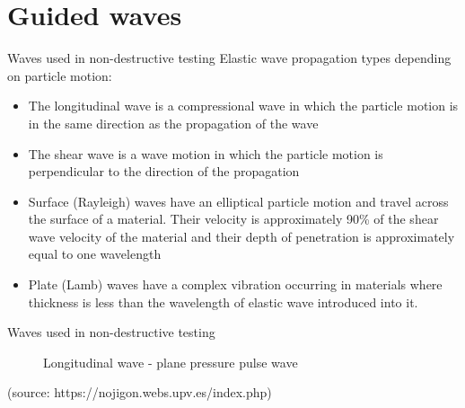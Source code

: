 \documentclass[10pt,aspectratio=169,dvipsnames]{beamer} %
\begin{document}
	\section{Guided waves}
	\begin{frame}{Waves used in non-destructive testing}
		Elastic wave propagation types depending on particle motion:
		\begin{itemize}
				\item  \alert{The longitudinal wave} is a compressional wave in which the particle motion is in the same direction as the propagation of the wave
				\item \alert{The shear wave} is a wave motion in which the particle motion is perpendicular to the direction of the propagation
				\item \alert{Surface (Rayleigh) waves} have an elliptical particle motion and travel across the surface of a material. Their velocity is approximately 90\% of the shear wave velocity of the material and their depth of penetration is approximately equal to one
				wavelength
				\item \alert{Plate (Lamb) waves} have a complex vibration occurring in materials where thickness is less than the wavelength of elastic wave introduced into it.
			\end{itemize}
	\end{frame}
	\setcounter{subfigure}{0}
	\begin{frame}{Waves used in non-destructive testing}
		\begin{figure}
				\caption{\alert{Longitudinal wave} - plane pressure pulse wave}
			\end{figure}
	\tiny 
	(source: https://nojigon.webs.upv.es/index.php)
	\end{frame}
	\setcounter{subfigure}{0}
\end{document}
